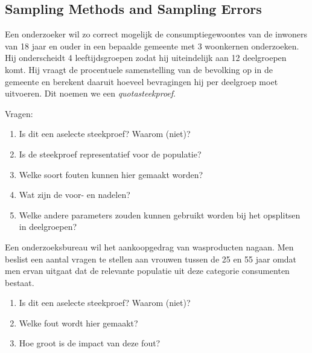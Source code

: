 \subsection{Sampling Methods and Sampling Errors}

\begin{exercise}
    Een onderzoeker wil zo correct mogelijk de consumptiegewoontes van de inwoners van 18 jaar en ouder in een bepaalde gemeente met 3 woonkernen onderzoeken.  Hij onderscheidt 4 leeftijdsgroepen zodat hij uiteindelijk aan 12 deelgroepen komt. Hij vraagt de procentuele samenstelling van de bevolking op in de gemeente en berekent daaruit hoeveel bevragingen hij per deelgroep moet uitvoeren. Dit noemen we een \emph{quotasteekproef}.
    
    Vragen:
    \begin{enumerate}[label=\alph*.]
        \item Is dit een aselecte steekproef? Waarom (niet)?
        \item Is de steekproef representatief voor de populatie?
        \item Welke soort fouten kunnen hier gemaakt worden?
        \item Wat zijn de voor- en nadelen?
        \item Welke andere parameters zouden kunnen gebruikt worden bij het opsplitsen in deelgroepen?
    \end{enumerate}
\end{exercise}

\begin{exercise}
    Een onderzoeksbureau wil het aankoopgedrag van wasproducten nagaan. Men beslist een aantal vragen te stellen aan vrouwen tussen de 25 en 55 jaar omdat men ervan uitgaat dat de relevante populatie uit deze categorie consumenten bestaat.
    
    \begin{enumerate}[label=\alph*.]
        \item Is dit een aselecte steekproef? Waarom (niet)?
        \item Welke fout wordt hier gemaakt?
        \item Hoe groot is de impact van deze fout?
    \end{enumerate}
\end{exercise}

